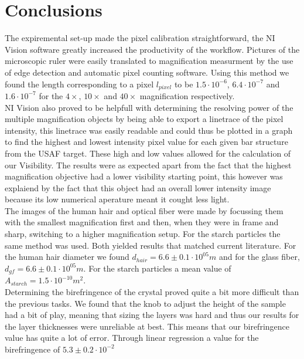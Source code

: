 \section{Conclusions}

The expiremental set-up made the pixel calibration straightforward, the NI Vision software greatly increased the productivity of the workflow. Pictures of the microscopic ruler were easily translated to magnification measurment by the use of edge detection and automatic pixel counting software. Using this method we found the length corresponding to a pixel $l_{pixel}$ to be $1.5\cdot10^{-6}$, $6.4\cdot10^{-7}$ and $1.6\cdot10^{-7}$ for the $4\times$, $10\times$ and $40\times$ magnification respectively.\\
NI Vision also proved to be helpfull with determining the resolving power of the multiple magnification objects by being able to export a linetrace of the pixel intensity, this linetrace was easily readable and could thus be plotted in a graph to find the highest and lowest intensity pixel value for each given bar structure from the USAF target. These high and low values allowed for the calculation of our Visibility. The results were as expected apart from the fact that the highest magnification objective had a lower visibility starting point, this however was explaiend by the fact that this object had an overall lower intensity image because its low numerical aperature meant it cought less light.\\
The images of the human hair and optical fiber were made by focussing them with the smallest magnification first and then, when they were in frame and sharp, switching to a higher magnification setup. For the starch particles the same method was used. Both yielded results that matched current literature. For the human hair diameter we found $d_{hair}=6.6\pm0.1\cdot10^{05} m$ and for the glass fiber, $d_{gf}=6.6\pm0.1\cdot10^{05} m$. For the starch particles a mean value of $A_{starch}=1.5\cdot10^{-10} m^2$.\\
Determining the birefringence of the crystal proved quite a bit more difficult than the previous tasks. We found that the knob to adjust the height of the sample had a bit of play, meaning that sizing the layers was hard and thus our results for the layer thicknesses were unreliable at best. This means that our birefringence value has quite a lot of error. Through linear regression a value for the birefringence of $5.3\pm0.2\cdot10^{-2}$\\

